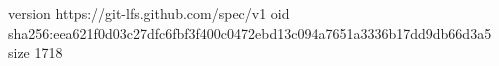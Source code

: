 version https://git-lfs.github.com/spec/v1
oid sha256:eea621f0d03c27dfc6fbf3f400c0472ebd13c094a7651a3336b17dd9db66d3a5
size 1718
